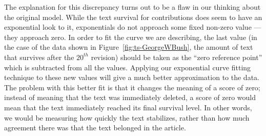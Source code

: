 The explanation for this discrepancy turns out to be a flaw in our
thinking about the original model.
While the text survival for contributions does seem to have an
exponential look to it, exponentials do not approach some fixed
non-zero value --- they approach zero.
In order to fit the curve we are describing, the last value
(in the case of the data shown in Figure~\ref{fig:ts-GeorgeWBush},
the amount of text that survives after the $20^{th}$ revision)
should be taken as the ``zero reference point'' which is subtracted
from all the values.
Applying our exponential curve fitting technique to these new values
will give a much better approximation to the data.
The problem with this better fit is that it changes the meaning of
a score of zero; instead of meaning that the text was immediately deleted,
a score of zero would mean that the text immediately reached its
final survival level.
In other words, we would be measuring how quickly the text stabilizes,
rather than how much agreement there was that the text belonged in
the article.

